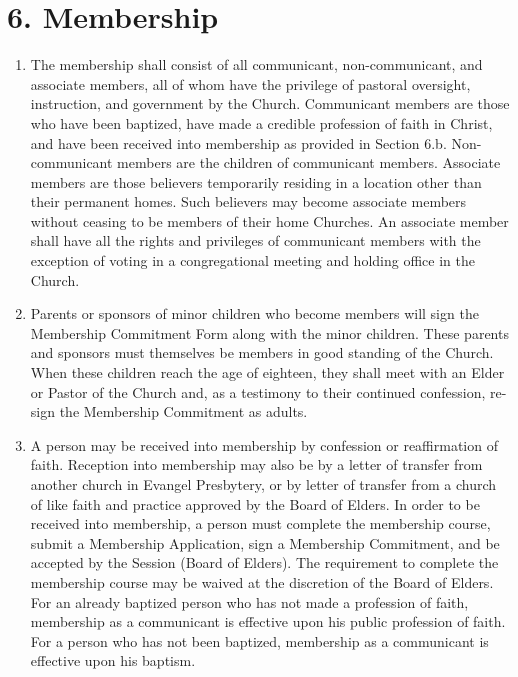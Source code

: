 \documentclass[
]{book}
\begin{document}
\hypertarget{membership}{%
\section*{6. Membership}\label{membership}}

\begin{enumerate}
\def\labelenumi{\alph{enumi}.}
\item
  The membership shall consist of all communicant, non-communicant, and associate members, all of whom have the privilege of pastoral oversight, instruction, and government by the Church. Com­mun­icant members are those who have been baptized, have made a credible profession of faith in Christ, and have been received into membership as provided in Section 6.b. Non-communicant members are the children of communicant members. Associate members are those believers temporarily residing in a location other than their permanent homes. Such believers may become associate members without ceasing to be members of their home Churches. An associate member shall have all the rights and privileges of communicant members with the exception of voting in a congregational meeting and holding office in the Church.
\item
  Parents or sponsors of minor children who become members will sign the Membership Commitment Form along with the minor children. These parents and sponsors must themselves be members in good standing of the Church. When these children reach the age of eighteen, they shall meet with an Elder or Pastor of the Church and, as a testimony to their continued confession, re-sign the Membership Commitment as adults.
\item
  A person may be received into membership by confession or reaffirmation of faith. Reception into membership may also be by a letter of transfer from another church in Evangel Presbytery, or by letter of transfer from a church of like faith and practice approved by the Board of Elders. In order to be received into membership, a person must complete the membership course, submit a Membership Application, sign a Membership Commitment, and be accepted by the Session (Board of Elders). The requirement to complete the membership course may be waived at the discretion of the Board of Elders. For an already baptized person who has not made a profession of faith, membership as a communicant is effective upon his public profession of faith. For a person who has not been baptized, membership as a communicant is effective upon his baptism.

\end{enumerate}
\end{document}
